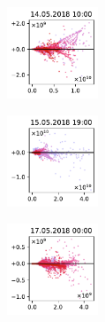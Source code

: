 \begin{figure}[H]
    \centering
    \begin{subfigure}
        \centering
        \includegraphics[width=0.30\textwidth,valign=t]{evaluation/figures/perturbations/perturbation-14.05.2018:10.00-nox-div-1.01.pdf}
    \end{subfigure}
    \begin{subfigure}
        \centering
        \includegraphics[width=0.30\textwidth,valign=t]{evaluation/figures/perturbations/perturbation-15.05.2018:19.00-nox-div-1.01.pdf}
    \end{subfigure}
    \begin{subfigure}
        \centering
        \includegraphics[width=0.30\textwidth,valign=t]{evaluation/figures/perturbations/perturbation-17.05.2018:00.00-nox-div-1.01.pdf}
    \end{subfigure}


\end{figure}
